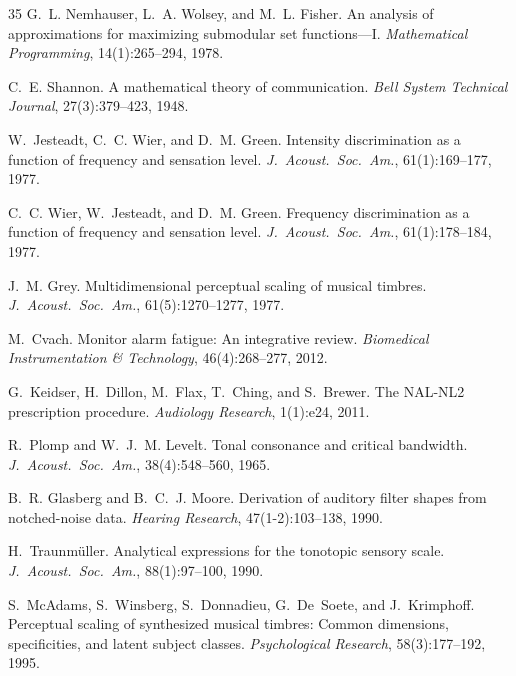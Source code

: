 \documentclass[sigchi, nonacm]{acmart}
\begin{document}
\begin{thebibliography}{35}
G.~L. Nemhauser, L.~A. Wolsey, and M.~L. Fisher.
\newblock An analysis of approximations for maximizing submodular set functions---I.
\newblock \emph{Mathematical Programming}, 14(1):265--294, 1978.

C.~E. Shannon.
\newblock A mathematical theory of communication.
\newblock \emph{Bell System Technical Journal}, 27(3):379--423, 1948.

W.~Jesteadt, C.~C. Wier, and D.~M. Green.
\newblock Intensity discrimination as a function of frequency and sensation level.
\newblock \emph{J.\ Acoust.\ Soc.\ Am.}, 61(1):169--177, 1977.

C.~C. Wier, W.~Jesteadt, and D.~M. Green.
\newblock Frequency discrimination as a function of frequency and sensation level.
\newblock \emph{J.\ Acoust.\ Soc.\ Am.}, 61(1):178--184, 1977.

J.~M. Grey.
\newblock Multidimensional perceptual scaling of musical timbres.
\newblock \emph{J.\ Acoust.\ Soc.\ Am.}, 61(5):1270--1277, 1977.

M.~Cvach.
\newblock Monitor alarm fatigue: An integrative review.
\newblock \emph{Biomedical Instrumentation \& Technology}, 46(4):268--277, 2012.

G.~Keidser, H.~Dillon, M.~Flax, T.~Ching, and S.~Brewer.
\newblock The NAL-NL2 prescription procedure.
\newblock \emph{Audiology Research}, 1(1):e24, 2011.

R.~Plomp and W.~J.~M. Levelt.
\newblock Tonal consonance and critical bandwidth.
\newblock \emph{J.\ Acoust.\ Soc.\ Am.}, 38(4):548--560, 1965.

B.~R. Glasberg and B.~C.~J. Moore.
\newblock Derivation of auditory filter shapes from notched-noise data.
\newblock \emph{Hearing Research}, 47(1-2):103--138, 1990.

H.~Traunm{\"u}ller.
\newblock Analytical expressions for the tonotopic sensory scale.
\newblock \emph{J.\ Acoust.\ Soc.\ Am.}, 88(1):97--100, 1990.

S.~McAdams, S.~Winsberg, S.~Donnadieu, G.~De~Soete, and J.~Krimphoff.
\newblock Perceptual scaling of synthesized musical timbres: Common dimensions, specificities, and latent subject classes.
\newblock \emph{Psychological Research}, 58(3):177--192, 1995.


\end{thebibliography}
\end{document}
